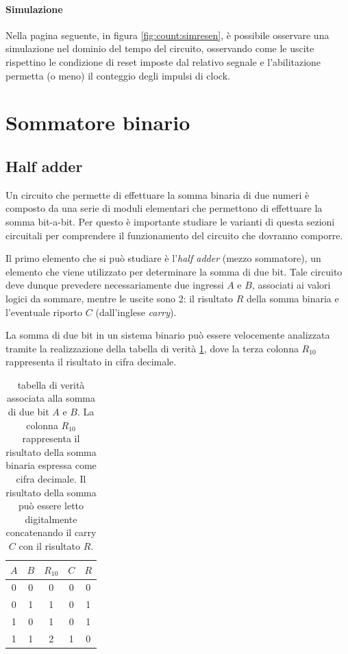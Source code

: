 	\paragraph{Simulazione} Nella pagina seguente, in figura \ref{fig:count:simresen}, è possibile osservare una simulazione nel dominio del tempo del circuito, osservando come le uscite rispettino le condizione di reset imposte dal relativo segnale e l'abilitazione permetta (o meno) il conteggio degli impulsi di clock.
	
\section{Sommatore binario}
\subsection*{Half adder}
	Un circuito che permette di effettuare la somma binaria di due numeri è composto da una serie di moduli elementari che permettono di effettuare la somma bit-a-bit. Per questo è importante studiare le varianti di questa sezioni circuitali per comprendere il funzionamento del circuito che dovranno comporre.
	
	Il primo elemento che si può studiare è l'\textit{half adder} (mezzo sommatore), un elemento che viene utilizzato per determinare la somma di due bit. Tale circuito deve dunque prevedere necessariamente due ingressi $A$ e $B$, associati ai valori logici da sommare, mentre le uscite sono 2: il risultato $R$ della somma binaria e l'eventuale riporto $C$ (dall'inglese \textit{carry}).
	
	La somma di due bit in un sistema binario può essere velocemente analizzata tramite la realizzazione della tabella di verità \ref{tab:ha:tabella}, dove la terza colonna $R_{10}$ rappresenta il risultato in cifra decimale.
	
	\begin{table}[bht]
		\centering
		\begin{tabular}{c c | c | c c }
			$A$ & $B$ & $R_{10}$ & $C$ & $R$ \\ \hline
			0 & 0 & 0 & 0 & 0 \\	
			0 & 1 & 1 & 0 & 1 \\	
			1 & 0 & 1 & 0 & 1 \\
			1 & 1 & 2 & 1 & 0 \\		
		\end{tabular}
		\caption{tabella di verità associata alla somma di due bit $A$ e $B$. La colonna $R_{10}$ rappresenta il risultato della somma binaria espressa come cifra decimale. Il risultato della somma può essere letto digitalmente concatenando il carry $C$ con il risultato $R$.}
		\label{tab:ha:tabella}
	\end{table}
	
